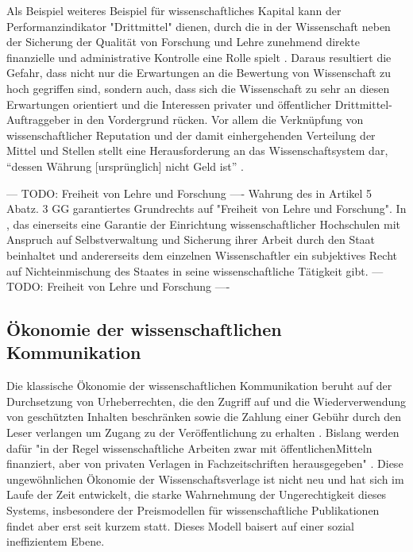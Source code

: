 Als Beispiel weiteres Beispiel für wissenschaftliches Kapital kann der Performanzindikator "Drittmittel" \cite{Jansen_2007} dienen, durch die in der Wissenschaft neben der Sicherung der Qualität von Forschung und Lehre zunehmend direkte finanzielle und administrative Kontrolle eine Rolle spielt \cite{Barl_sius_2008}. Daraus resultiert die Gefahr, dass nicht nur die Erwartungen an die Bewertung von Wissenschaft zu hoch gegriffen sind, sondern auch, dass sich die Wissenschaft zu sehr an diesen Erwartungen orientiert und die Interessen privater und öffentlicher Drittmittel-Auftraggeber in den Vordergrund rücken.  Vor allem die Verknüpfung von wissenschaftlicher Reputation und der damit einhergehenden Verteilung der Mittel und Stellen stellt eine Herausforderung an das Wissenschaftsystem dar, “dessen Währung [ursprünglich] nicht Geld ist” \cite{hanekop_2006}. 

--- TODO: Freiheit von Lehre und Forschung ----
Wahrung des in Artikel 5 Abatz. 3 GG garantiertes Grundrechts auf "Freiheit von Lehre und Forschung". In , das einerseits eine Garantie der Einrichtung wissenschaftlicher Hochschulen mit Anspruch auf Selbstverwaltung und Sicherung ihrer Arbeit durch den Staat beinhaltet und andererseits dem einzelnen Wissenschaftler ein subjektives Recht auf Nichteinmischung des Staates in seine wissenschaftliche Tätigkeit gibt. --- TODO: Freiheit von Lehre und Forschung ----

\subsection{Ökonomie der wissenschaftlichen Kommunikation}
Die klassische Ökonomie der wissenschaftlichen Kommunikation beruht auf der Durchsetzung von Urheberrechten, die den Zugriff auf und die Wiederverwendung von geschützten Inhalten beschränken sowie die Zahlung einer Gebühr durch den Leser verlangen um Zugang zu der Veröffentlichung zu erhalten \cite{CREATe_2014}. Bislang werden dafür "in der Regel wissenschaftliche Arbeiten zwar mit öffentlichenMitteln finanziert, aber von privaten Verlagen in Fachzeitschriften herausgegeben" \cite{WD_bundestag_2009}. Diese ungewöhnlichen Ökonomie der Wissenschaftsverlage ist nicht neu und hat sich im Laufe der Zeit entwickelt, die starke Wahrnehmung der Ungerechtigkeit dieses Systems, insbesondere der Preismodellen für wissenschaftliche Publikationen\cite{King_2008} findet aber erst seit kurzem statt\cite{CREATe_2014}. Dieses Modell baisert auf einer sozial ineffizientem Ebene\cite{mueller-langer_2010}.

